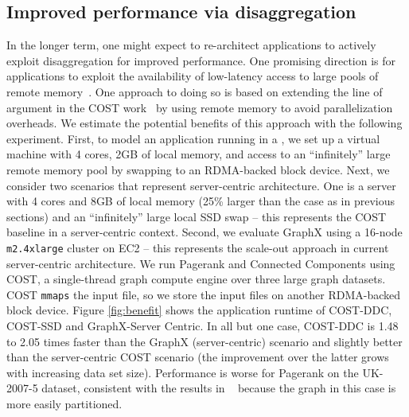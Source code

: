 \subsection{Improved performance via disaggregation}
In the longer term, one might expect to re-architect applications to actively exploit disaggregation for improved performance.
One promising direction is for applications to exploit the availability of low-latency access to large pools of remote memory~\cite{ddcHwDesign1}. 
One approach to doing so is based on extending the line of argument in the COST work~\cite{cost} by using remote memory to avoid parallelization overheads.
We estimate the potential benefits of this approach with the following experiment.
First, to model an application running in a \dis, we set up a virtual machine with 4 cores,  2GB of local memory, and access to an ``infinitely'' large remote memory pool by swapping to an RDMA-backed block device. 
Next, we consider two scenarios that represent server-centric architecture.
One is a server with 4 cores and 8GB of local memory (25\% larger than the \dis case as in previous sections) and an ``infinitely'' large local SSD swap -- this represents the COST baseline in a server-centric context. 
Second, we evaluate GraphX using a 16-node \texttt{m2.4xlarge} cluster on EC2 -- this represents the scale-out approach in current server-centric architecture.
We run Pagerank and Connected Components using COST, a single-thread graph compute engine over three large graph datasets. COST \texttt{mmaps} the input file, so we store the input files on another RDMA-backed block device.
Figure \ref{fig:benefit} shows the application runtime of COST-DDC, COST-SSD and GraphX-Server Centric.
In all but one case, COST-DDC is 1.48 to 2.05 times faster than the GraphX (server-centric) scenario and slightly better than the server-centric COST scenario (the improvement over the latter grows with increasing data set size). Performance is worse for Pagerank on the UK-2007-5 dataset, consistent with the results in ~\cite{cost} because the graph in this case is more easily partitioned. 



